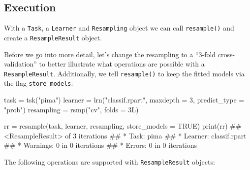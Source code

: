 \documentclass[
  11pt,
  parskip=half,
  DIV=calc,
  BCOR=10mm,
  x11names]{scrbook}
\newenvironment{Shaded}{}{}
\newcommand{\DataTypeTok}[1]{#1}
\newcommand{\DecValTok}[1]{#1}
\newcommand{\KeywordTok}[1]{\textcolor[rgb]{0.00,0.00,1.00}{#1}}
\newcommand{\NormalTok}[1]{#1}
\newcommand{\OtherTok}[1]{\textcolor[rgb]{1.00,0.25,0.00}{#1}}
\newcommand{\StringTok}[1]{\textcolor[rgb]{0.00,0.50,0.50}{#1}}
\begin{document}
\hypertarget{resampling-exec}{%
\subsection{Execution}\label{resampling-exec}}

With a \texttt{Task}, a \texttt{Learner} and \texttt{Resampling} object we can call \texttt{resample()} and create a \texttt{ResampleResult} object.

Before we go into more detail, let's change the resampling to a ``3-fold cross-validation'' to better illustrate what operations are possible with a \texttt{ResampleResult}.
Additionally, we tell \texttt{resample()} to keep the fitted models via the flag \texttt{store\_models}:

\begin{Shaded}
\begin{Highlighting}[]
\NormalTok{task =}\StringTok{ }\KeywordTok{tsk}\NormalTok{(}\StringTok{"pima"}\NormalTok{)}
\NormalTok{learner =}\StringTok{ }\KeywordTok{lrn}\NormalTok{(}\StringTok{"classif.rpart"}\NormalTok{, }\DataTypeTok{maxdepth =} \DecValTok{3}\NormalTok{, }\DataTypeTok{predict_type =} \StringTok{"prob"}\NormalTok{)}
\NormalTok{resampling =}\StringTok{ }\KeywordTok{rsmp}\NormalTok{(}\StringTok{"cv"}\NormalTok{, }\DataTypeTok{folds =}\NormalTok{ 3L)}

\NormalTok{rr =}\StringTok{ }\KeywordTok{resample}\NormalTok{(task, learner, resampling, }\DataTypeTok{store_models =} \OtherTok{TRUE}\NormalTok{)}
\KeywordTok{print}\NormalTok{(rr)}
\NormalTok{## <ResampleResult> of 3 iterations}
\NormalTok{## * Task: pima}
\NormalTok{## * Learner: classif.rpart}
\NormalTok{## * Warnings: 0 in 0 iterations}
\NormalTok{## * Errors: 0 in 0 iterations}
\end{Highlighting}
\end{Shaded}

The following operations are supported with \texttt{ResampleResult} objects:
\end{document}
